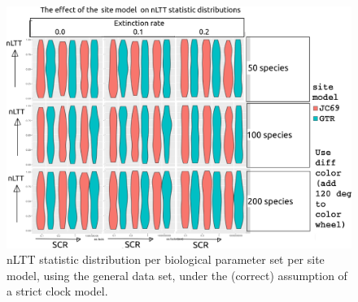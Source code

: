 \begin{figure}[!htbp]
  \includegraphics[width=\textwidth]{fig_site_model.png}
  \caption{
    nLTT statistic distribution per biological parameter set per site model,
    using the general data set, 
    under the (correct) assumption of a strict clock model.
  }
\end{figure}

